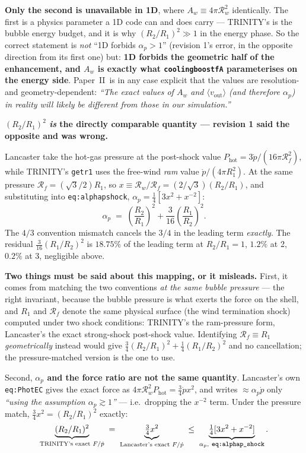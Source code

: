 \documentclass[11pt,a4paper,oneside]{report}
\newcommand{\brkus}{\textunderscore\allowbreak}
\newcommand{\code}[1]{\texttt{\small\let\_\brkus #1}}
\newcommand{\lbl}[1]{\texttt{\footnotesize\let\_\brkus #1}}
\newcommand{\PII}{Paper~II}
\newcommand{\Rw}{\mathcal{R}_{w}}
\newcommand{\Rf}{\mathcal{R}_{f}}
\newcommand{\pdotw}{\dot p}
\newcommand{\ap}{\alpha_p}
\newcommand{\up}[1]{\textcolor{tqaccent}{\textbf{#1}}}
\begin{document}
\up{Only the second is unavailable in 1D}, where $A_w\equiv4\pi\Rw^2$ identically. The first is a
physics parameter a 1D code can and does carry --- TRINITY's is the bubble energy budget, and it is
why $(R_2/R_1)^2\gg1$ in the energy phase. So the correct statement is \emph{not} ``1D forbids
$\ap>1$'' (revision 1's error, in the opposite direction from its first one) but: \up{1D forbids the
geometric half of the enhancement, and $A_w$ is exactly what \code{cooling\_boost\_fA}
parameterises on the energy side}. \PII\ is in any case explicit that the values are resolution- and
geometry-dependent: \emph{``The exact values of $A_w$ and $\langle v_{\mathrm{out}}\rangle$ (and
therefore $\ap$) in reality will likely be different from those in our simulation.''}

\begin{keybox}
\textbf{\sffamily $(R_2/R_1)^2$ \emph{is} the directly comparable quantity --- revision 1
said the opposite and was wrong.}

Lancaster take the hot-gas pressure at the post-shock value
$P_{\mathrm{hot}} = 3\pdotw/(16\pi\Rf^2)$, while TRINITY's \code{get\_r1} uses the free-wind
\emph{ram} value $\pdotw/(4\pi R_1^2)$. At the same pressure $\Rf = (\sqrt3/2)R_1$, so
$x \equiv \Rw/\Rf = (2/\sqrt3)(R_2/R_1)$, and substituting into \lbl{eq:alphap\_shock},
$\ap=\tfrac14[3x^2+x^{-2}]$:
\[
\ap \;=\; \left(\frac{R_2}{R_1}\right)^{2} + \frac{3}{16}\left(\frac{R_1}{R_2}\right)^{2}.
\]
The $4/3$ convention mismatch cancels the $3/4$ in the leading term \emph{exactly}. The residual
$\tfrac{3}{16}(R_1/R_2)^2$ is $18.75\%$ of the leading term at $R_2/R_1=1$, $1.2\%$ at 2,
$0.2\%$ at 3, negligible above.
\end{keybox}

\textbf{Two things must be said about this mapping, or it misleads.} First, it comes from matching
the two conventions \emph{at the same bubble pressure} --- the right invariant, because the bubble
pressure is what exerts the force on the shell, and $R_1$ and $\Rf$ denote the same physical surface
(the wind termination shock) computed under two shock conditions: TRINITY's the ram-pressure form,
Lancaster's the exact strong-shock post-shock value. Identifying $\Rf\equiv R_1$ \emph{geometrically}
instead would give $\tfrac34(R_2/R_1)^2+\tfrac14(R_1/R_2)^2$ and no cancellation; the
pressure-matched version is the one to use.

Second, \up{$\ap$ and the force ratio are not the same quantity}. Lancaster's own
\lbl{eq:Phot\_EC} gives the exact force as $4\pi\Rw^2 P_{\mathrm{hot}} = \tfrac34\pdotw x^2$, and
writes $\approx\ap\pdotw$ only \emph{``using the assumption $\ap \gtrsim 1$''} --- i.e.\ dropping the
$x^{-2}$ term. Under the pressure match, $\tfrac34 x^2 = (R_2/R_1)^2$ exactly:
\[
\underbrace{(R_2/R_1)^2}_{\text{TRINITY's exact }F/\pdotw}
\;=\;\underbrace{\tfrac34 x^2}_{\text{Lancaster's exact }F/\pdotw}
\;\le\;\underbrace{\tfrac14[3x^2+x^{-2}]}_{\ap,\ \lbl{eq:alphap\_shock}} .
\]
\end{document}
